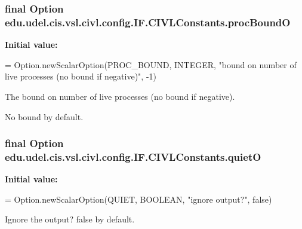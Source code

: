 \subsubsection[{proc\+Bound\+O}]{\setlength{\rightskip}{0pt plus 5cm}final Option edu.\+udel.\+cis.\+vsl.\+civl.\+config.\+I\+F.\+C\+I\+V\+L\+Constants.\+proc\+Bound\+O\hspace{0.3cm}{\ttfamily [static]}}\label{classedu_1_1udel_1_1cis_1_1vsl_1_1civl_1_1config_1_1IF_1_1CIVLConstants_a8fdd648c7a222f4855d9ed644c818e6f}
{\bfseries Initial value\+:}
\begin{DoxyCode}
= Option.newScalarOption(PROC\_BOUND,
            INTEGER,
            \textcolor{stringliteral}{"bound on number of live processes (no bound if negative)"}, -1)
\end{DoxyCode}


The bound on number of live processes (no bound if negative). 

No bound by default. \hypertarget{classedu_1_1udel_1_1cis_1_1vsl_1_1civl_1_1config_1_1IF_1_1CIVLConstants_a1e27a5de82b9f6ea3eaa4ccd18d3530a}{}
\subsubsection[{quiet\+O}]{\setlength{\rightskip}{0pt plus 5cm}final Option edu.\+udel.\+cis.\+vsl.\+civl.\+config.\+I\+F.\+C\+I\+V\+L\+Constants.\+quiet\+O\hspace{0.3cm}{\ttfamily [static]}}\label{classedu_1_1udel_1_1cis_1_1vsl_1_1civl_1_1config_1_1IF_1_1CIVLConstants_a1e27a5de82b9f6ea3eaa4ccd18d3530a}
{\bfseries Initial value\+:}
\begin{DoxyCode}
= Option.newScalarOption(QUIET, BOOLEAN,
            \textcolor{stringliteral}{"ignore output?"}, \textcolor{keyword}{false})
\end{DoxyCode}


Ignore the output? false by default. 

\hypertarget{classedu_1_1udel_1_1cis_1_1vsl_1_1civl_1_1config_1_1IF_1_1CIVLConstants_a5372bfb45f6d88e4f226d45d179419a2}{}
